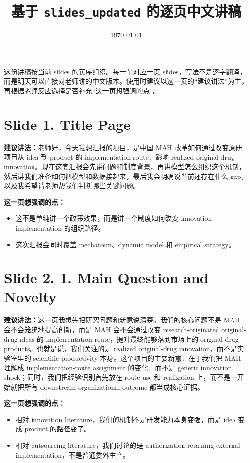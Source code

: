 \documentclass[12pt]{ctexart}
\title{基于 \texttt{slides\_updated} 的逐页中文讲稿}
\author{}
\date{\today}
\begin{document}
\maketitle

\noindent 这份讲稿按当前 slides 的页序组织。每一节对应一页 slides，写法不是逐字翻译，而是明天可以直接对老师讲的中文版本。使用时建议以这一页的“建议讲法”为主，再根据老师反应选择是否补充“这一页想强调的点”。

\newpage
\section*{Slide 1. Title Page}
\textbf{建议讲法：}老师好，今天我想汇报的项目，是中国 MAH 改革如何通过改变原研项目从 idea 到 product 的 implementation route，影响 realized original-drug innovation。现在这套汇报会先讲问题和制度背景，再讲模型怎么组织这个机制，然后讲我们准备如何把模型和数据接起来，最后我会明确说当前还存在什么 gap，以及我希望请老师帮我们判断哪些关键问题。

\vspace{0.5em}
\textbf{这一页想强调的点：}
\begin{itemize}
\item 这不是单纯讲一个政策效果，而是讲一个制度如何改变 innovation implementation 的组织路径。
\item 这次汇报会同时覆盖 mechanism、dynamic model 和 empirical strategy。
\end{itemize}

\newpage
\section*{Slide 2. 1. Main Question and Novelty}
\textbf{建议讲法：}这一页我想先把研究问题和新意说清楚。我们的核心问题不是 MAH 会不会笼统地提高创新，而是 MAH 会不会通过改变 research-originated original-drug ideas 的 implementation route，提升最终能够落到市场上的 original-drug products。也就是说，我们关注的是 realized original-drug innovation，而不是实验室里的 scientific productivity 本身。这个项目的主要新意，在于我们把 MAH 理解成 implementation-route assignment 的变化，而不是 generic innovation shock；同时，我们把经验识别首先放在 route use 和 realization 上，而不是一开始就把所有 downstream organizational outcome 都当成核心证据。

\vspace{0.5em}
\textbf{这一页想强调的点：}
\begin{itemize}
\item 相对 innovation literature，我们的机制不是研发能力本身变强，而是 idea 变成 product 的路径变了。
\item 相对 outsourcing literature，我们讨论的是 authorization-retaining external implementation，不是普通委外生产。
\end{itemize}
\end{document}
